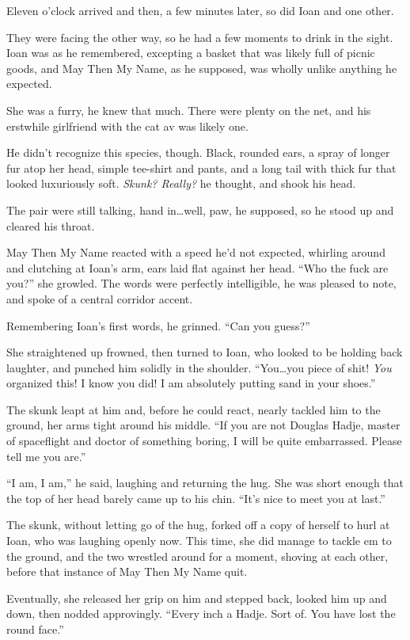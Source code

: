 Eleven o'clock arrived and then, a few minutes later, so did Ioan and one other.

They were facing the other way, so he had a few moments to drink in the sight. Ioan was as he remembered, excepting a basket that was likely full of picnic goods, and May Then My Name, as he supposed, was wholly unlike anything he expected.

She was a furry, he knew that much. There were plenty on the net, and his erstwhile girlfriend with the cat av was likely one.

He didn't recognize this species, though. Black, rounded ears, a spray of longer fur atop her head, simple tee-shirt and pants, and a long tail with thick fur that looked luxuriously soft. \emph{Skunk? Really?} he thought, and shook his head.

The pair were still talking, hand in\ldots well, paw, he supposed, so he stood up and cleared his throat.

May Then My Name reacted with a speed he'd not expected, whirling around and clutching at Ioan's arm, ears laid flat against her head. ``Who the fuck are you?'' she growled. The words were perfectly intelligible, he was pleased to note, and spoke of a central corridor accent.

Remembering Ioan's first words, he grinned. ``Can you guess?''

She straightened up frowned, then turned to Ioan, who looked to be holding back laughter, and punched him solidly in the shoulder. ``You\ldots you piece of shit! \emph{You} organized this! I know you did! I am absolutely putting sand in your shoes.''

The skunk leapt at him and, before he could react, nearly tackled him to the ground, her arms tight around his middle. ``If you are not Douglas Hadje, master of spaceflight and doctor of something boring, I will be quite embarrassed. Please tell me you are.''

``I am, I am,'' he said, laughing and returning the hug. She was short enough that the top of her head barely came up to his chin. ``It's nice to meet you at last.''

The skunk, without letting go of the hug, forked off a copy of herself to hurl at Ioan, who was laughing openly now. This time, she did manage to tackle em to the ground, and the two wrestled around for a moment, shoving at each other, before that instance of May Then My Name quit.

Eventually, she released her grip on him and stepped back, looked him up and down, then nodded approvingly. ``Every inch a Hadje. Sort of. You have lost the round face.''

